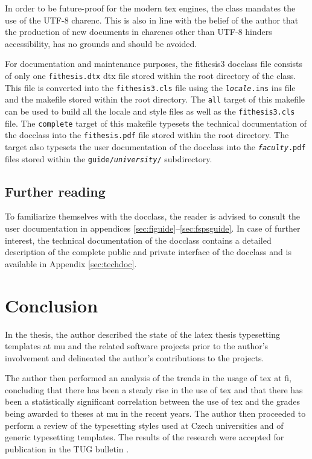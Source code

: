 \documentclass[digital,table,color]{fithesis3/fithesis3}
\begin{document}
  In order to be future-proof for the modern \gls{tex} engines, the
  class mandates the use of the UTF-8 \gls{charenc}. This is also
  in line with the belief of the author that the production of new
  documents in \glspl{charenc} other than UTF-8 hinders
  accessibility, has no grounds and should be avoided.

  For documentation and maintenance purposes, the
  \textsf{fithesis3} \gls{docclass} file consists of only one
  \texttt{fithesis.dtx} \gls{dtx} file stored within the root
  directory of the class. This file is converted into the
  \texttt{fithesis3.cls} file using the
  \texttt{\textit{locale}.ins} \gls{ins} file and the
  \gls{makefile} stored within the root directory. The \texttt{all}
  target of this \gls{makefile} can be used to build all the locale
  and style files as well as the \texttt{fithesis3.cls} file. The
  \texttt{complete} target of this \gls{makefile} typesets the
  technical documentation of the \gls{docclass} \cite{novotny15}
  into the \texttt{fithesis.pdf} file stored within the root
  directory. The target also typesets the user documentation of the
  \gls{docclass} into the \texttt{\textit{faculty}.pdf} files
  stored within the \texttt{guide/\textit{university}/}
  subdirectory.

  \section{Further reading}
  To familiarize themselves with the \gls{docclass}, the reader
  is advised to consult the user documentation in appendices
  \ref{sec:figuide}--\ref{sec:fspsguide}. In case of further
  interest, the technical documentation of the \gls{docclass}
  contains a detailed description of the complete public and
  private interface of the \gls{docclass} and is available in
  Appendix \ref{sec:techdoc}. 

\chapter{Conclusion}
In the thesis, the author described the state of the \gls{latex}
thesis typesetting templates at \gls{mu} and the related software
projects prior to the author's involvement and delineated the
author's contributions to the projects.

The author then performed an analysis of the trends in the usage of
\gls{tex} at \gls{fi}, concluding that there has been a steady rise
in the use of \gls{tex} and that there has been a statistically
significant correlation between the use of \gls{tex} and the grades
being awarded to theses at \gls{mu} in the recent years. The author
then proceeded to perform a review of the typesetting styles used
at Czech universities and of generic typesetting templates. The
results of the research were accepted for publication in the \CS
TUG bulletin \cite{cstug}.
\end{document}
